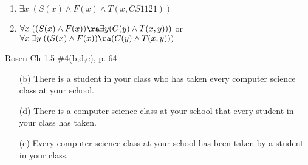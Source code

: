 \begin{questions}
\begin{solution}
\begin{enumerate}[label=(\alph*),itemsep=0pt,parsep=0pt,
    	topsep=0pt,partopsep=0pt]
            Conversationally, ``All freshman take CS1000."
        \item $\exists x\; (S(x) \wedge F(x) \wedge T(x,CS 1121))$
        \item $\forall x\; ((S(x) \wedge F(x)) \ra \exists y (C(y) \wedge T(x,y)))$ or \\
        $\forall x\; \exists y\; ((S(x) \wedge F(x)) \ra (C(y) \wedge T(x,y)))$
    \end{enumerate}
\end{solution}



 Rosen Ch 1.5 \#4(b,d,e), p. 64
    \ifprintanswers
        \vspace{-12pt}
    \fi
  \begin{solution}
      \begin{itemize}[itemsep=0pt,parsep=0pt,topsep=0pt,partopsep=0pt]
         \item[(b)] There is a student in your class who has taken every computer science class at your school.
          \item[(d)] There is a computer science class at your school that every student in your class has taken.
          \item[(e)] Every computer science class at your school has been taken by a student in your class.
      \end{itemize}
  \end{solution}





\end{questions}
